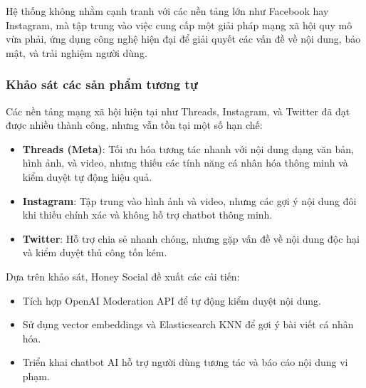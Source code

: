 Hệ thống không nhằm cạnh tranh với các nền tảng lớn như Facebook hay Instagram, mà tập trung vào việc cung cấp một giải pháp mạng xã hội quy mô vừa phải, ứng dụng công nghệ hiện đại để giải quyết các vấn đề về nội dung, bảo mật, và trải nghiệm người dùng.

\subsubsection{Khảo sát các sản phẩm tương tự}
Các nền tảng mạng xã hội hiện tại như Threads, Instagram, và Twitter đã đạt được nhiều thành công, nhưng vẫn tồn tại một số hạn chế:
\begin{itemize}
    \item \textbf{Threads (Meta)}: Tối ưu hóa tương tác nhanh với nội dung dạng văn bản, hình ảnh, và video, nhưng thiếu các tính năng cá nhân hóa thông minh và kiểm duyệt tự động hiệu quả.
    \item \textbf{Instagram}: Tập trung vào hình ảnh và video, nhưng các gợi ý nội dung đôi khi thiếu chính xác và không hỗ trợ chatbot thông minh.
    \item \textbf{Twitter}: Hỗ trợ chia sẻ nhanh chóng, nhưng gặp vấn đề về nội dung độc hại và kiểm duyệt thủ công tốn kém.
\end{itemize}

Dựa trên khảo sát, Honey Social đề xuất các cải tiến:
\begin{itemize}
    \item Tích hợp OpenAI Moderation API để tự động kiểm duyệt nội dung.
    \item Sử dụng vector embeddings và Elasticsearch KNN để gợi ý bài viết cá nhân hóa.
    \item Triển khai chatbot AI hỗ trợ người dùng tương tác và báo cáo nội dung vi phạm.
\end{itemize}


